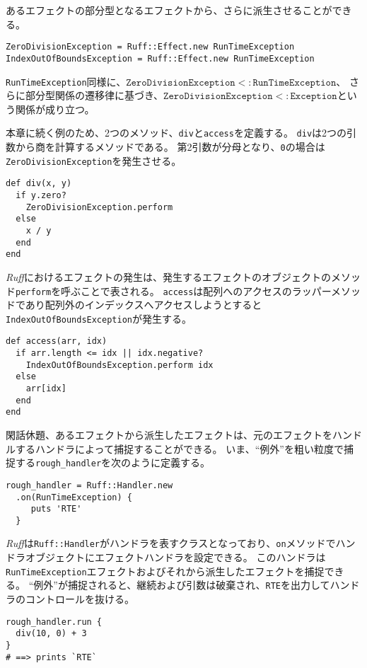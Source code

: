\documentclass{ltjsarticle}
\begin{document}
あるエフェクトの部分型となるエフェクトから、さらに派生させることができる。
\begin{lstlisting}
ZeroDivisionException = Ruff::Effect.new RunTimeException
IndexOutOfBoundsException = Ruff::Effect.new RunTimeException
\end{lstlisting}
\lstinline{RunTimeException}同様に、$\mathtt{ZeroDivisionException} <: \mathtt{RunTimeException}$、%
  さらに部分型関係の遷移律に基づき、$\mathtt{ZeroDivisionException} <: \mathtt{Exception}$という関係が成り立つ。

本章に続く例のため、2つのメソッド、\lstinline{div}と\lstinline{access}を定義する。
\lstinline{div}は2つの引数から商を計算するメソッドである。
第2引数が分母となり、\lstinline{0}の場合は\lstinline{ZeroDivisionException}を発生させる。
\begin{lstlisting}
def div(x, y)
  if y.zero?
    ZeroDivisionException.perform
  else
    x / y
  end
end
\end{lstlisting}
\textit{Ruff}におけるエフェクトの発生は、発生するエフェクトのオブジェクトのメソッド\lstinline{perform}を呼ぶことで表される。
\lstinline{access}は配列へのアクセスのラッパーメソッドであり配列外のインデックスへアクセスしようとすると\lstinline{IndexOutOfBoundsException}が発生する。
\begin{lstlisting}
def access(arr, idx)
  if arr.length <= idx || idx.negative?
    IndexOutOfBoundsException.perform idx
  else
    arr[idx]
  end
end
\end{lstlisting}

閑話休題、あるエフェクトから派生したエフェクトは、元のエフェクトをハンドルするハンドラによって捕捉することができる。
いま、``例外''を粗い粒度で捕捉する\lstinline{rough_handler}を次のように定義する。
\begin{lstlisting}
rough_handler = Ruff::Handler.new
  .on(RunTimeException) {
     puts 'RTE'
  }
\end{lstlisting}
\textit{Ruff}は\lstinline{Ruff::Handler}がハンドラを表すクラスとなっており、\lstinline{on}メソッドでハンドラオブジェクトにエフェクトハンドラを設定できる。
このハンドラは\lstinline{RunTimeException}エフェクトおよびそれから派生したエフェクトを捕捉できる。
``例外''が捕捉されると、継続および引数は破棄され、\lstinline{RTE}を出力してハンドラのコントロールを抜ける。
\begin{lstlisting}
rough_handler.run {
  div(10, 0) + 3
}
# ==> prints `RTE`
\end{lstlisting}
\end{document}
